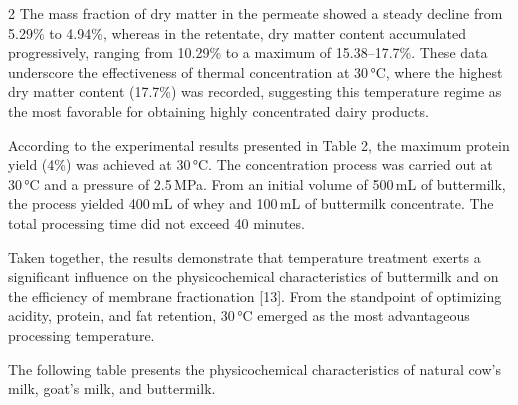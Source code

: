 \begin{multicols}{2}
The mass fraction of dry matter in the permeate showed a steady decline
from 5.29\% to 4.94\%, whereas in the retentate, dry matter content
accumulated progressively, ranging from 10.29\% to a maximum of
15.38--17.7\%. These data underscore the effectiveness of thermal
concentration at 30\,°C, where the highest dry matter content (17.7\%)
was recorded, suggesting this temperature regime as the most favorable
for obtaining highly concentrated dairy products.

According to the experimental results presented in Table 2, the maximum
protein yield (4\%) was achieved at 30\,°C. The concentration process
was carried out at 30\,°C and a pressure of 2.5\,MPa. From an initial
volume of 500\,mL of buttermilk, the process yielded 400\,mL of whey and
100\,mL of buttermilk concentrate. The total processing time did not
exceed 40 minutes.

Taken together, the results demonstrate that temperature treatment
exerts a significant influence on the physicochemical characteristics of
buttermilk and on the efficiency of membrane fractionation {[}13{]}.
From the standpoint of optimizing acidity, protein, and fat retention,
30\,°C emerged as the most advantageous processing temperature.

The following table presents the physicochemical characteristics of
natural cow's milk, goat's milk, and buttermilk.
\end{multicols}
\vspace{-0.5cm}
\vspace{-0.3cm}
